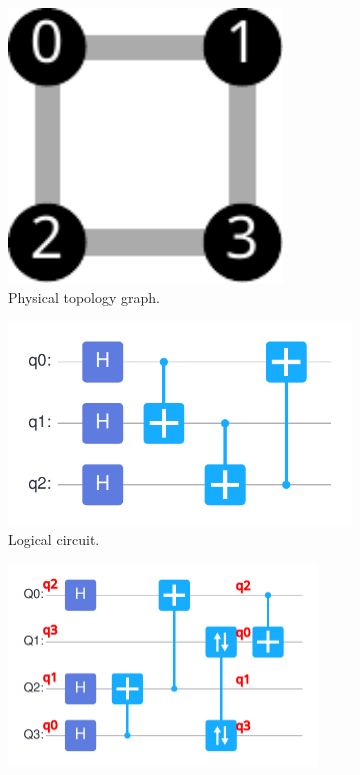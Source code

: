 \begin{figure}
	\centering
	\begin{subfigure}{0.1\textwidth}
		\includegraphics[width=0.8\textwidth]{8.2_figures/topo_3}
		\caption{Physical topology graph.}
		\label{fig:qubit-mapping-physical-topo}
	\end{subfigure}
	\begin{subfigure}{0.35\textwidth}
		\includegraphics[width=\textwidth]{8.2_figures/logical}
		\caption{Logical circuit.}
		\label{fig:qubit-mapping-logical-circuit}
	\end{subfigure}
	\begin{subfigure}{0.45\textwidth}
		\includegraphics[width=0.9\textwidth]{8.2_figures/physical}

\end{subfigure}
\end{figure}
